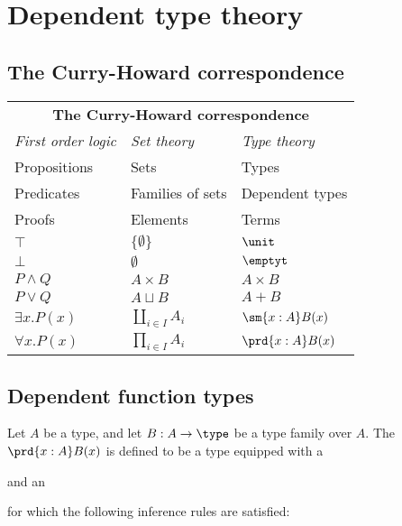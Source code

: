 \chapter{Dependent type theory}

\section{The Curry-Howard correspondence}
\begin{center}
\bigskip
\begin{tabular}{lll}
\toprule
\multicolumn{3}{c}{\large\textbf{The Curry-Howard correspondence}}\\[2ex]
\emph{First order logic} & \emph{Set theory} & \emph{Type theory}\\
\midrule
Propositions & Sets & Types\\
Predicates & Families of sets & Dependent types\\
Proofs & Elements & Terms \\
$\top$ & $\{\emptyset\}$ & $\unit$\\
$\bot$ & $\emptyset$ & $\emptyt$ \\
$P \land Q$ & $A \times B$ & $A \times B$ \\
$P \vee Q$ & $A \sqcup B$ & $A + B$ \\
$\exists x.P(x)$ & $\coprod_{i\in I}A_i$ & $\sm{x:A}B(x)$ \\
$\forall x.P(x)$ & $\prod_{i\in I}A_i$ & $\prd{x:A}B(x)$\\
\bottomrule
\end{tabular}

\bigskip
\end{center}

\section{Dependent function types}
\begin{defn}
Let $A$ be a type, and let $B:A\to\type$ be a type family over $A$.
The  $\prd{x:A}B(x)$ is defined to be a type equipped with a 
\begin{prooftree}
\end{prooftree}
and an 
\begin{prooftree}
\end{prooftree}
for which the following inference rules are satisfied:
\begin{prooftree}
\end{prooftree}
\begin{prooftree}
\end{prooftree}
\end{defn}

